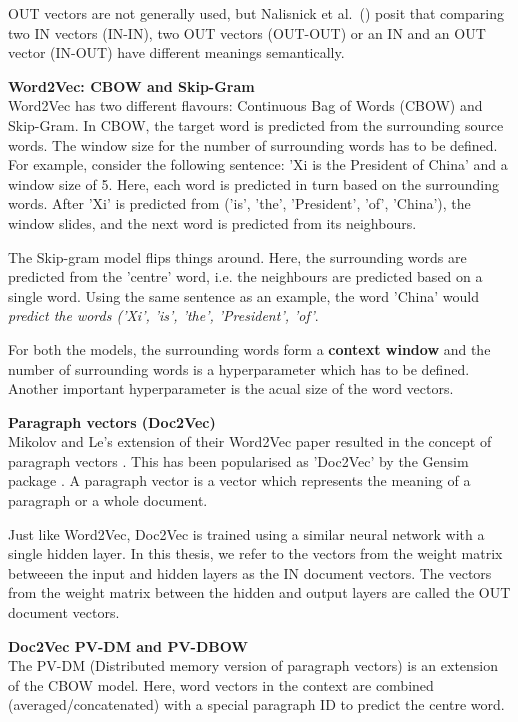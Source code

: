 OUT vectors are not generally used, but Nalisnick et al.~(\cite{NalisnickMCC16}) posit that comparing two IN vectors (IN-IN), two OUT vectors (OUT-OUT) or an IN and an OUT vector (IN-OUT) have different meanings semantically.

\textbf{Word2Vec: CBOW and Skip-Gram}\\
Word2Vec has two different flavours: Continuous Bag of Words (CBOW) and Skip-Gram. In CBOW, the target word is predicted from the surrounding source words. The window size for the number of surrounding words has to be defined. For example, consider the following sentence: 'Xi is the President of China' and a window size of 5. Here, each word is predicted in turn based on the surrounding words. After 'Xi' is predicted from  ('is', 'the', 'President', 'of', 'China'), the window slides, and the next word is predicted from its neighbours.

The Skip-gram model flips things around. Here, the surrounding words are predicted from the 'centre' word, i.e. the neighbours are predicted based on a single word. Using the same sentence as an example, the word 'China' would \textit{predict the words ('Xi', 'is', 'the', 'President', 'of'}.

For both the models, the surrounding words form a \textbf{context window} and the number of surrounding words is a hyperparameter which has to be defined.
Another important hyperparameter is the acual size of the word vectors.

\textbf{Paragraph vectors (Doc2Vec)}\\
Mikolov and Le's extension of their Word2Vec paper \cite{MikolovSCCD13} resulted in the concept of paragraph vectors \cite{LeM14}. This has been popularised as 'Doc2Vec' by the Gensim package \cite{rehureklrec}. A paragraph vector is a vector which represents the meaning of a paragraph or a whole document. 

Just like Word2Vec, Doc2Vec is trained using a similar neural network with a single hidden layer. In this thesis, we refer to the vectors from the weight matrix betweeen the input and hidden layers as the IN document vectors. The vectors from the weight matrix between the hidden and output layers are called the OUT document vectors.

\textbf{Doc2Vec PV-DM and PV-DBOW}\\
The PV-DM (Distributed memory version of paragraph vectors) is an extension of the CBOW model. Here, word vectors in the context are combined (averaged/concatenated) with a special paragraph ID to predict the centre word. 

